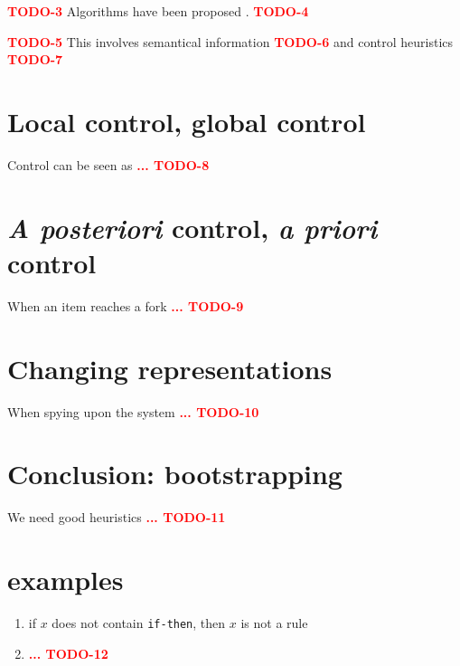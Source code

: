 \documentclass[11pt,a4paper,svgnames]{article}
\begin{document}
  {\textcolor{red}{\textbf{TODO-3}}}
  Algorithms have been proposed \cite{Forgy-Rete-1982}.
  {\textcolor{red}{\textbf{TODO-4}}}


  {\textcolor{red}{\textbf{TODO-5}}}
  This involves semantical information
  {\textcolor{red}{\textbf{TODO-6}}}
  and control heuristics \cite{Lenat-Heuristics-1982,Lenat-Eurisko-1983}
  {\textcolor{red}{\textbf{TODO-7}}}

  \section{Local control, global control}
  \label{sec:loc-glob-control}

  Control can be seen as
  {\textcolor{red}{\textbf{... TODO-8}}}


  \section{\textit{A posteriori} control, \textit{a priori} control}
  \label{sec:posteriori-priori-control}
When an item reaches a fork
  {\textcolor{red}{\textbf{... TODO-9}}}

  \section{Changing representations}
  \label{sec:changing-repr}
  When spying upon the system
  {\textcolor{red}{\textbf{... TODO-10}}}

  \section{Conclusion: bootstrapping}
  \label{sec:concl-bootstrap}
  We need good heuristics
  {\textcolor{red}{\textbf{... TODO-11}}}

  \section*{examples}

  \begin{enumerate}
  \item if $x$ does not contain \texttt{if-then}, then $x$ is not a rule
    \item
      {\textcolor{red}{\textbf{... TODO-12}}}

  \end{enumerate}

\clearpage
{}



\end{document}
